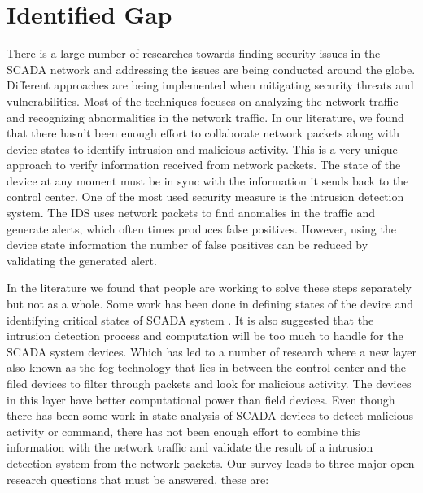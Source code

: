 \documentclass[letterpaper, 10 pt, conference]{ieeeconf}  %
\begin{document}
\section{Identified Gap}
There is a large number of researches towards finding security issues in the SCADA network and addressing the issues are being conducted around the globe. Different approaches are being implemented when mitigating security threats and vulnerabilities. Most of the techniques focuses on analyzing the network traffic and recognizing abnormalities in the network traffic. In our literature, we found that there hasn't been enough effort to collaborate network packets along with device states to identify intrusion and malicious activity. This is a very unique approach to verify information received from network packets. The state of the device at any moment must be in sync with the information it sends back to the control center. One of the most used security measure is the intrusion detection system. The IDS uses network packets to find anomalies in the traffic and generate alerts, which often times produces false positives. However, using the device state information the number of false positives can be reduced by validating the generated alert. 
\par
In the literature we found that people are working to solve these steps separately but not as a whole. Some work has been done in defining states of the device and identifying critical states of SCADA system \cite{c3}. It is also suggested that the intrusion detection process and computation will be too much to handle for the SCADA system devices. Which has led to a number of research where a new layer also known as the fog technology that lies in between the control center and the filed devices to filter through packets and look for malicious activity. The devices in this layer have better computational power than field devices. Even though there has been some work in state analysis of SCADA devices to detect malicious activity or command, there has not been enough effort to combine this information with the network traffic and validate the result of a intrusion detection system from the network packets. Our survey leads to three major open research questions that must be answered. these are:
\end{document}
